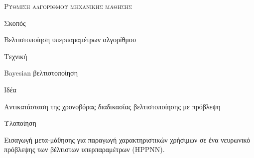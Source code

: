 \documentclass{beamer}
\begin{document}
  \begin{frame} { \scshape Ρύθμιση αλγορίθμου μηχανικής μάθησης}
  	\begin{minipage}[t]{.3\textwidth}  		
  		Σκοπός
  		\vspace{4ex}
  	\end{minipage}%
  	\begin{minipage}[t]{.6\textwidth}
  		Βελτιστοποίηση υπερπαραμέτρων αλγορίθμου  	
  		\vspace{4ex}
  	\end{minipage}
  	\begin{minipage}[t]{.3\textwidth}  		
  		Τεχνική
  		\vspace{4ex}
  	\end{minipage}%
  	\begin{minipage}[t]{.6\textwidth}
  		Bayesian βελτιστοποίηση
  		\vspace{4ex} 
  	\end{minipage}
  	\begin{minipage}[t]{.3\textwidth}  		
  		Ιδέα
  		\vspace{4ex}
  	\end{minipage}%
  	\begin{minipage}[t]{.6\textwidth}
  		Αντικατάσταση της χρονοβόρας διαδικασίας βελτιστοποίησης με πρόβλεψη
  		\vspace{4ex}
  	\end{minipage}
  	\begin{minipage}[t]{.3\textwidth}  		
  		Υλοποίηση
  		\vspace{4ex}
  	\end{minipage}%
  	\begin{minipage}[t]{.6\textwidth}
  		Εισαγωγή μετα-μάθησης για παραγωγή χαρακτηριστικών χρήσιμων σε ένα νευρωνικό πρόβλεψης των βέλτιστων υπερπαραμέτρων (HPPNN).
  		\vspace{4ex}
  	\end{minipage}
  \end{frame}
\end{document}
